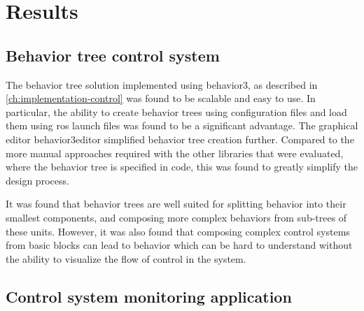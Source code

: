 \documentclass[\rootfolder/main.tex]{subfiles}
\begin{document}
\chapter{Results}
\label{ch:results} %



\section{Behavior tree control system}


The behavior tree solution implemented using behavior3, as described in \cref{ch:implementation-control} was found to be scalable and easy to use.
In particular, the ability to create behavior trees using configuration files and load them using \acrshort{ros} launch files was found to be a significant advantage.
The graphical editor behavior3editor simplified behavior tree creation further.
Compared to the more manual approaches required with the other libraries that were evaluated, where the behavior tree is specified in code, this was found to greatly simplify the design process.

It was found that behavior trees are well suited for splitting behavior into their smallest components, and composing more complex behaviors from sub-trees of these units.
However, it was also found that composing complex control systems from basic blocks can lead to behavior which can be hard to understand without the ability to visualize the flow of control in the system.


\section{Control system monitoring application}

\end{document}
